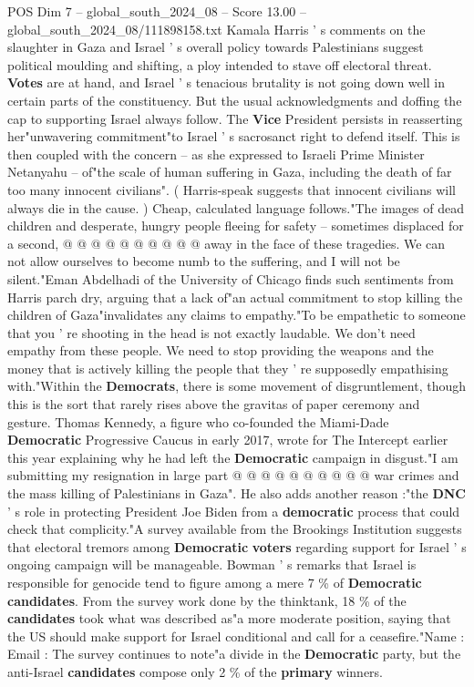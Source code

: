 \begin{textsample}{POS Dim 7 – global\_south\_2024\_08 – Score 13.00 – global\_south\_2024\_08/111898158.txt}
Kamala Harris ' s comments on the slaughter in Gaza and Israel ' s overall policy towards Palestinians suggest political moulding and shifting, a ploy intended to stave off electoral threat. \textbf{Votes} are at hand, and Israel ' s tenacious brutality is not going down well in certain parts of the constituency.
But the usual acknowledgments and doffing the cap to supporting Israel always follow.
The \textbf{Vice} President persists in reasserting her"unwavering commitment"to Israel ' s sacrosanct right to defend itself.
This is then coupled with the concern -- as she expressed to Israeli Prime Minister Netanyahu -- of"the scale of human suffering in Gaza, including the death of far too many innocent civilians". ( Harris-speak suggests that innocent civilians will always die in the cause. ) Cheap, calculated language follows."The images of dead children and desperate, hungry people fleeing for safety -- sometimes displaced for a second, @ @ @ @ @ @ @ @ @ @ away in the face of these tragedies.
We can not allow ourselves to become numb to the suffering, and I will not be silent."Eman Abdelhadi of the University of Chicago finds such sentiments from Harris parch dry, arguing that a lack of"an actual commitment to stop killing the children of Gaza"invalidates any claims to empathy."To be empathetic to someone that you ' re shooting in the head is not exactly laudable.
We don't need empathy from these people.
We need to stop providing the weapons and the money that is actively killing the people that they ' re supposedly empathising with."Within the \textbf{Democrats}, there is some movement of disgruntlement, though this is the sort that rarely rises above the gravitas of paper ceremony and gesture.
Thomas Kennedy, a figure who co-founded the Miami-Dade \textbf{Democratic} Progressive Caucus in early 2017, wrote for The Intercept earlier this year explaining why he had left the \textbf{Democratic} campaign in disgust."I am submitting my resignation in large part @ @ @ @ @ @ @ @ @ @ war crimes and the mass killing of Palestinians in Gaza".
He also adds another reason :"the \textbf{DNC} ' s role in protecting President Joe Biden from a \textbf{democratic} process that could check that complicity."A survey available from the Brookings Institution suggests that electoral tremors among \textbf{Democratic} \textbf{voters} regarding support for Israel ' s ongoing campaign will be manageable.
Bowman ' s remarks that Israel is responsible for genocide tend to figure among a mere 7 \% of \textbf{Democratic} \textbf{candidates}.
From the survey work done by the thinktank, 18 \% of the \textbf{candidates} took what was described as"a more moderate position, saying that the US should make support for Israel conditional and call for a ceasefire."Name : Email : The survey continues to note"a divide in the \textbf{Democratic} party, but the anti-Israel \textbf{candidates} compose only 2 \% of the \textbf{primary} winners.

\end{textsample}
